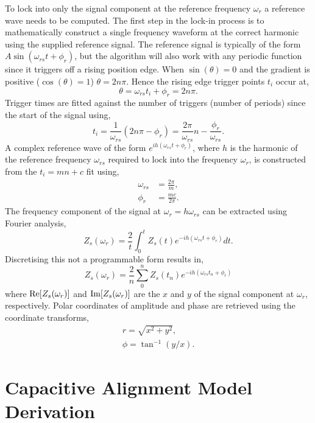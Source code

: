 \documentclass[12pt, a4paper, twoside]{book}
\begin{document}
To lock into only the signal component at the reference frequency $\omega_r$ a reference wave needs to be computed. The first step in the lock-in process is to mathematically construct a single frequency waveform at the correct harmonic using the supplied reference signal. The reference signal is typically of the form $A\sin(\omega_{rs} t + \phi_r)$, but the algorithm will also work with any periodic function since it triggers off a rising position edge.
When $\sin(\theta)=0$ and the gradient is positive ($\cos(\theta)=1$) $\theta=2n\pi$. Hence the rising edge trigger points $t_i$ occur at,
\begin{equation} \theta = \omega_{rs} t_i + \phi_r = 2n\pi. \end{equation}
Trigger times are fitted against the number of triggers (number of periods) since the start of the signal using,
\begin{equation}
t_i = \frac{1}{\omega_{rs}}(2n\pi - \phi_r) = \frac{2\pi}{\omega_{rs}}n - \frac{\phi_r}{\omega_{rs}}.
\end{equation}
A complex reference wave of the form $e^{ih(\omega_{rs} t + \phi_r)}$, where $h$ is the harmonic of the reference frequency $\omega_{rs}$ required to lock into the frequency $\omega_r$, is constructed from the $t_i=mn+c$ fit using,
\begin{align}
\omega_{rs} &= \frac{2\pi}{m}, \\
\phi_r &= \frac{mc}{2\pi}.
\end{align}
The frequency component of the signal at $\omega_r=h\omega_{rs}$ can be extracted using Fourier analysis,
\begin{equation}
Z_s(\omega_r) = \frac{2}{t} \int_0^t{Z_s(t) e^{-ih(\omega_{rs} t + \phi_r)} dt}.
\end{equation}
Discretising this not a programmable form results in,
\begin{equation}
Z_s(\omega_r) = \frac{2}{n} \sum_0^n{Z_s(t_n) e^{-ih(\omega_{rs} t_n + \phi_r)}}
\end{equation}
where $\mathrm{Re}\!\left[{Z_s(\omega_r)}\right]$ and $\mathrm{Im}\!\left[{Z_s(\omega_r)}\right]$ are the $x$ and $y$ of the signal component at $\omega_r$, respectively. Polar coordinates of amplitude and phase are retrieved using the coordinate transforms,
\begin{align}
r = \sqrt{x^2 + y^2}, \\
\phi = \tan^{-1}(y/x).
\end{align}

\section{Capacitive Alignment Model Derivation}
\end{document}
